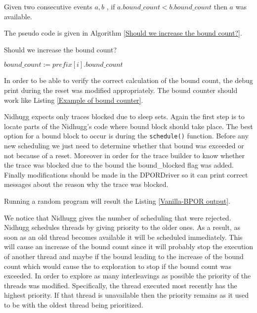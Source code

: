 Given two consecutive events $a,b$ , if $a.bound\_count < b.bound\_count$ then $a$ was available.

The pseudo code is given in Algorithm \ref{Should we increase the bound count?}.

\begin{algorithm}
    \caption{Should we increase the bound count?}
    \label{Should we increase the bound count?}
    $bound\_count := prefix[i].bound\_count$  \;

\end{algorithm}


In order to be able to verify the correct calculation of the bound count, the debug print during the reset was modified appropriately.
The bound counter should work like Listing \ref{Example of bound counter}.


Nidhugg expects only traces blocked due to sleep sets. Again the first step is to locate parts of the Nidhugg's code
where bound block should take place. The best option for a bound block to occur is during the \verb|schedule()|
function. Before any new scheduling we just need to determine whether that bound was exceeded or not because of a reset.
Moreover in order for the trace builder to know whether the trace was blocked due to the bound the bound\_blocked flag
was added. Finally modifications should be made in the DPORDriver so it can print correct messages about the reason why
the trace was blocked.

Running a random program will result the Listing \ref{Vanilla-BPOR output}.

We notice that Nidhugg gives the number of scheduling that were rejected. Nidhugg schedules threads by giving priority
to the older ones. As a result, as soon as an old thread becomes available it will be scheduled immediately. This will
cause an increase of the bound count since it will probably stop the execution of another thread and maybe if the bound
leading to the increase of the bound count which would cause the to exploration to stop if the bound count was exceeded.
In order to explore as many interleavings as possible the priority of the threads was modified. Specifically, the thread
executed most recently has the highest priority. If that thread is unavailable then the priority remains as it used to
be with the oldest thread being prioritized.

